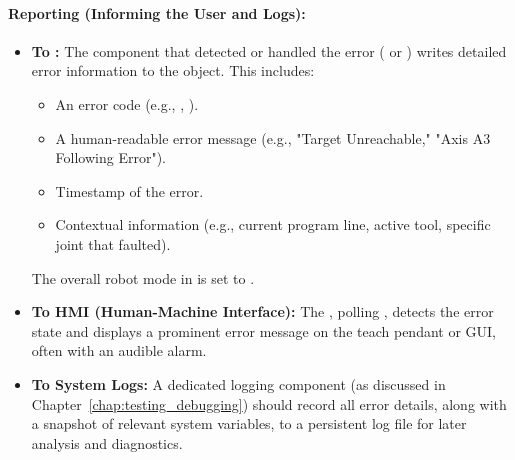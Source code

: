 \paragraph{Reporting (Informing the User and Logs):}
\begin{itemize}
    \item \textbf{To :} The component that detected or handled the error ( or ) writes detailed error information to the  object. This includes:
        \begin{itemize}
            \item An error code (e.g., , ).
            \item A human-readable error message (e.g., "Target Unreachable," "Axis A3 Following Error").
            \item Timestamp of the error.
            \item Contextual information (e.g., current program line, active tool, specific joint that faulted).
        \end{itemize}
        The overall robot mode in  is set to .
    \item \textbf{To HMI (Human-Machine Interface):} The , polling , detects the error state and displays a prominent error message on the teach pendant or GUI, often with an audible alarm.
    \item \textbf{To System Logs:} A dedicated logging component (as discussed in Chapter~\ref{chap:testing_debugging}) should record all error details, along with a snapshot of relevant system variables, to a persistent log file for later analysis and diagnostics.
\end{itemize}

